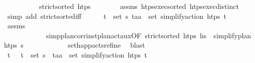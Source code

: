 \begin{isabellebody}
%
\isadelimproof
\ \ %
\endisadelimproof
%
\isatagproof
{}\isamarkupfalse%
\ {\isacharminus}{\kern0pt}\isanewline
\ \ \ \ \isamarkupfalse%
\ {\isachardoublequoteopen}strict{\isacharunderscore}{\kern0pt}sorted\ htps{\isachardoublequoteclose}\isanewline
\ \ \ \ \ \ \isamarkupfalse%
\ assms\ htps{\isacharunderscore}{\kern0pt}exec{\isacharunderscore}{\kern0pt}sorted\ htps{\isacharunderscore}{\kern0pt}exec{\isacharunderscore}{\kern0pt}distinct\ \isamarkupfalse%
\ {\isacharparenleft}{\kern0pt}simp\ add{\isacharcolon}{\kern0pt}\ strict{\isacharunderscore}{\kern0pt}sorted{\isacharunderscore}{\kern0pt}iff{\isacharparenright}{\kern0pt}\isanewline
\ \ \ \ \isamarkupfalse%
\ {\isachardoublequoteopen}{\isasymexists}{\isacharparenleft}{\kern0pt}t\isactrlsub {\isasympi}{\isacharcomma}{\kern0pt}{\isasympi}{\isacharparenright}{\kern0pt}\ {\isasymin}\ set\ {\isasympi}s{\isachardot}{\kern0pt}\ {\isacharparenleft}{\kern0pt}t\isactrlsub a{\isacharcomma}{\kern0pt}a{\isacharparenright}{\kern0pt}\ {\isasymin}\ set\ {\isacharparenleft}{\kern0pt}simplify{\isacharunderscore}{\kern0pt}action\ htps\ {\isacharparenleft}{\kern0pt}t\isactrlsub {\isasympi}{\isacharcomma}{\kern0pt}{\isasympi}{\isacharparenright}{\kern0pt}{\isacharparenright}{\kern0pt}{\isachardoublequoteclose}\isanewline
\ \ \ \ \ \ \isamarkupfalse%
\ assms\isanewline
\ \ \ \ \ \ \ \ \ \ \ \ simp{\isacharunderscore}{\kern0pt}plan{\isacharunderscore}{\kern0pt}corr{\isacharunderscore}{\kern0pt}inst{\isacharunderscore}{\kern0pt}plan{\isacharunderscore}{\kern0pt}act{\isacharunderscore}{\kern0pt}aux{\isacharbrackleft}{\kern0pt}OF\ {\isacartoucheopen}strict{\isacharunderscore}{\kern0pt}sorted\ htps{\isacartoucheclose}\ {\isacartoucheopen}hs\ {\isacharequal}{\kern0pt}\ simplify{\isacharunderscore}{\kern0pt}plan\ htps\ {\isasympi}s{\isacartoucheclose}{\isacharbrackright}{\kern0pt}\isanewline
\ \ \ \ \ \ \ \ \ \ \ \ set{\isacharunderscore}{\kern0pt}happ{\isacharunderscore}{\kern0pt}acts{\isacharunderscore}{\kern0pt}refine\ \isamarkupfalse%
\ blast\isanewline
\ \ \ \ \isamarkupfalse%
\ \isamarkupfalse%
\ t\isactrlsub {\isasympi}\ {\isasympi}\ \ {\isachardoublequoteopen}{\isacharparenleft}{\kern0pt}t\isactrlsub {\isasympi}{\isacharcomma}{\kern0pt}{\isasympi}{\isacharparenright}{\kern0pt}\ {\isasymin}\ set\ {\isasympi}s{\isachardoublequoteclose}\ \ {\isachardoublequoteopen}{\isacharparenleft}{\kern0pt}t\isactrlsub a{\isacharcomma}{\kern0pt}a{\isacharparenright}{\kern0pt}\ {\isasymin}\ set\ {\isacharparenleft}{\kern0pt}simplify{\isacharunderscore}{\kern0pt}action\ htps\ {\isacharparenleft}{\kern0pt}t\isactrlsub {\isasympi}{\isacharcomma}{\kern0pt}{\isasympi}{\isacharparenright}{\kern0pt}{\isacharparenright}{\kern0pt}{\isachardoublequoteclose}\isanewline

\end{isabellebody}
